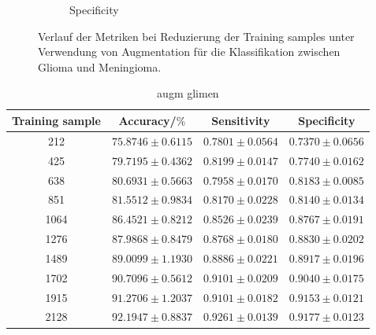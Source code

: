 \begin{figure}[H]
\begin{subfigure}[b]{0.48\textwidth}
    \caption{Specificity}
    \label{fig:augm-spec}
  \end{subfigure}
  \caption{Verlauf der Metriken bei Reduzierung der Training samples unter Verwendung von Augmentation für die Klassifikation zwischen Glioma und Meningioma.}
  \label{fig:gli-men-augm}
\end{figure}
\begin{table}[H]
    \centering
    {\small
        \begin{tabular}{cccc}
            \toprule
            Training sample & Accuracy/$\%$ & Sensitivity & Specificity\\
            \midrule
            212  & $75.8746 \pm 0.6115$ & $0.7801 \pm 0.0564$ & $0.7370 \pm 0.0656$ \\
            425  & $79.7195 \pm 0.4362$ & $0.8199 \pm 0.0147$ & $0.7740 \pm 0.0162$ \\
            638  & $80.6931 \pm 0.5663$ & $0.7958 \pm 0.0170$ & $0.8183 \pm 0.0085$ \\
            851  & $81.5512 \pm 0.9834$ & $0.8170 \pm 0.0228$ & $0.8140 \pm 0.0134$ \\
            1064 & $86.4521 \pm 0.8212$ & $0.8526 \pm 0.0239$ & $0.8767 \pm 0.0191$ \\
            1276 & $87.9868 \pm 0.8479$ & $0.8768 \pm 0.0180$ & $0.8830 \pm 0.0202$ \\
            1489 & $89.0099 \pm 1.1930$ & $0.8886 \pm 0.0221$ & $0.8917 \pm 0.0196$ \\
            1702 & $90.7096 \pm 0.5612$ & $0.9101 \pm 0.0209$ & $0.9040 \pm 0.0175$ \\
            1915 & $91.2706 \pm 1.2037$ & $0.9101 \pm 0.0182$ & $0.9153 \pm 0.0121$ \\
            2128 & $92.1947 \pm 0.8837$ & $0.9261 \pm 0.0139$ & $0.9177 \pm 0.0123$ \\         
            \bottomrule
        \end{tabular}}
  \caption{augm glimen}
  \label{tab:gli-men-augm}
\end{table}

